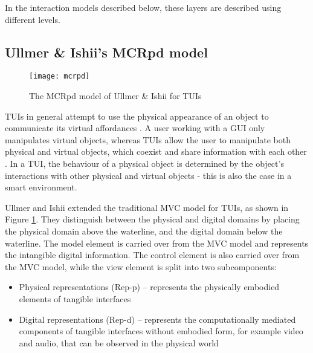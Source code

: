 
In the interaction models described below, these layers are described using different levels. 


\subsection{Ullmer \& Ishii's MCRpd model}
\label{ullmer}
\begin{figure}
	\centering
	\centerline{\texttt{[image: mcrpd]}}
	\caption{The MCRpd model of Ullmer \& Ishii for \acp{TUI}}
	\label{mcrpd}
\end{figure}

\acp{TUI} in general attempt to use the physical appearance of an object to communicate its virtual affordances \cite{Bellotti2002}. A user working with a \ac{GUI} only manipulates virtual objects, whereas \acp{TUI} allow the user to manipulate both physical and virtual objects, which coexist and share information with each other \cite{Shaer2004}. In a \ac{TUI}, the behaviour of a physical object is determined by the object's interactions with other physical and virtual objects - this is also the case in a smart environment.

Ullmer and Ishii \cite{Ullmer2000} extended the traditional \ac{MVC} model for \acp{TUI}, as shown in Figure \ref{mcrpd}. They distinguish between the physical and digital domains by placing the physical domain above the waterline, and the digital domain below the waterline. The model element is carried over from the \ac{MVC} model and represents the intangible digital information. The control element is also carried over from the \ac{MVC} model, while the view element is split into two subcomponents: 

\begin{itemize}
	\item Physical representations (Rep-p) -- represents the physically embodied elements of tangible interfaces
	\item Digital representations (Rep-d) -- represents the computationally mediated components of tangible interfaces without embodied form, for example video and audio, that can be observed in the physical world  
\end{itemize}

